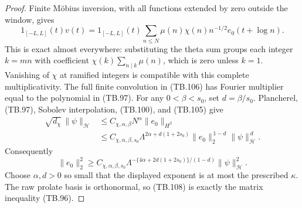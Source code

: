 \begin{proof}
Finite Möbius inversion, with all functions extended by
zero outside the window, gives
\[
 1_{[-L,L]}(t)v(t)=
 1_{[-L,L]}(t)\sum_{n\leq N}\mu(n)\chi(n)n^{-1/2}
                                      e_0(t+\log n).
 \tag{TB.106}
\]
This is exact almost everywhere: substituting the theta
sum groups each integer \(k=mn\) with coefficient
\(\chi(k)\sum_{n\mid k}\mu(n)\), which is zero unless
\(k=1\).  Vanishing of \(\chi\) at ramified integers is
compatible with this complete multiplicativity.
The full finite convolution in (TB.106) has Fourier
multiplier equal to the polynomial in (TB.97).
For any \(0<\beta<s_0\), set \(d=\beta/s_0\).
Plancherel, (TB.97), Sobolev interpolation, (TB.100),
and (TB.105) give
\[
 \begin{split}
 \sqrt{d_\chi}\,\|\psi\|_{\mathcal H}
 &\leq C_{\chi,\alpha,\beta}N^\alpha
                                         \|e_0\|_{H^\beta}\\
 &\leq C_{\chi,\alpha,\beta,s_0}
      \Lambda^{2\alpha+d(1+2s_0)}
               \|e_0\|_2^{\,1-d}\|\psi\|_{\mathcal H}^{\,d}.
 \end{split}
 \tag{TB.107}
\]
Consequently
\[
 \|e_0\|_2^2
    \geq C_{\chi,\alpha,\beta,s_0}
       \Lambda^{-\{4\alpha+2d(1+2s_0)\}/(1-d)}
                                      \|\psi\|_{\mathcal H}^2.
 \tag{TB.108}
\]
Choose \(\alpha,d>0\) so small that the displayed exponent
is at most the prescribed \(\kappa\).
The raw prolate basis is orthonormal, so (TB.108) is
exactly the matrix inequality (TB.96).
\end{proof}

